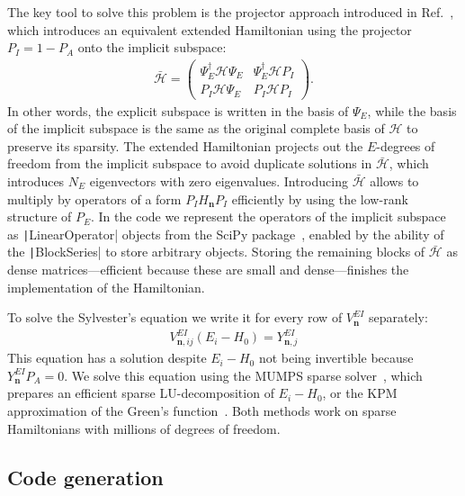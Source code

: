 The key tool to solve this problem is the projector approach introduced in Ref.~\cite{Irfan_2019}, which introduces an equivalent extended Hamiltonian using the projector $P_I = 1 - P_A$ onto the implicit subspace:
%
\begin{align}
\bar{\mathcal{H}} = \begin{pmatrix}
\Psi_E^\dagger \mathcal{H} \Psi_E & \Psi_E^\dagger \mathcal{H} P_I \\
P_I \mathcal{H} \Psi_E & P_I \mathcal{H} P_I
\end{pmatrix}.
\end{align}
%
In other words, the explicit subspace is written in the basis of $\Psi_E$, while the basis of the implicit subspace is the same as the original complete basis of $\mathcal{H}$ to preserve its sparsity.
The extended Hamiltonian projects out the $E$-degrees of freedom from the implicit subspace to avoid duplicate solutions in $\bar{\mathcal{H}}$, which introduces $N_E$ eigenvectors with zero eigenvalues.
Introducing $\bar{\mathcal{H}}$ allows to multiply by operators of a form $P_I H_\mathbf{n} P_I$ efficiently by using the low-rank structure of $P_E$.
In the code we represent the operators of the implicit subspace as \texttt|LinearOperator| objects from the SciPy package~\cite{Virtanen_2020}, enabled by the ability of the \texttt|BlockSeries| to store arbitrary objects.
Storing the remaining blocks of $\bar{\mathcal{H}}$ as dense matrices---efficient because these are small and dense---finishes the implementation of the Hamiltonian.

To solve the Sylvester's equation we write it for every row of $V_{\mathbf{n}}^{EI}$ separately:
%
\begin{align}
V_{\mathbf{n}, ij}^{EI} (E_i - H_0) = Y^{EI}_{\mathbf{n}, j}
\end{align}
%
This equation has a solution despite $E_i - H_0$ not being invertible because $Y^{EI}_{\mathbf{n}} P_A = 0$.
We solve this equation using the MUMPS sparse solver~\cite{Amestoy_2001,Amestoy_2006}, which prepares an efficient sparse LU-decomposition of $E_i - H_0$, or the KPM approximation of the Green's function~\cite{Weisse_2006}.
Both methods work on sparse Hamiltonians with millions of degrees of freedom.

\subsection{Code generation}
\label{sec:codegen}


